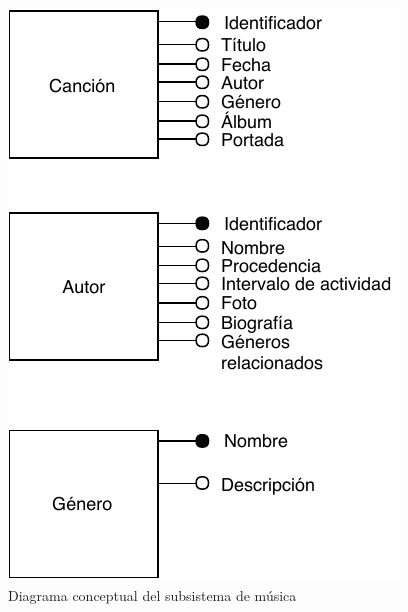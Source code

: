 \begin{figure}[H]
  \caption{Diagrama conceptual del subsistema de música}
  \centering
  \includegraphics[scale=1.1]{diagramas/musica-conceptual.pdf}
\end{figure}

